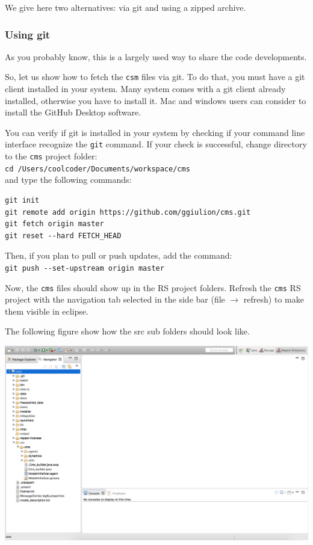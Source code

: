 \documentclass{article}
\begin{document}
We give here two alternatives: via git and using a zipped archive.

\subsubsection{Using git}

As you probably know, this is a largely used way to share the code developments.

So, let us show how to fetch the \verb+csm+ files via git. To do that, you must have a git client installed in your system. Many system comes with a git client already installed, otherwise you have to install it. Mac and windows users can consider to install the GitHub Desktop software.

You can verify if git is installed in your system by checking if your command line interface recognize the \verb+git+ command.  
If your check is successful, change directory to the \verb+cms+ project folder:\\
\verb+cd /Users/coolcoder/Documents/workspace/cms+\\
and type the following commands:
\begin{verbatim}
git init
git remote add origin https://github.com/ggiulion/cms.git
git fetch origin master
git reset --hard FETCH_HEAD
\end{verbatim}

Then, if you plan to pull or push updates, add the command:\\
\verb+git push --set-upstream origin master+

Now, the \verb+cms+ files should show up in the RS project folders.
Refresh the \verb+cms+ RS project with the navigation tab selected in the side bar (file $\rightarrow$ refresh) to make them visible in eclipse.

The following figure show how the src sub folders should look like.

\vskip2mm
\noindent
\includegraphics[scale=0.35]{fig_cms_rs_navigation1}
\end{document}
